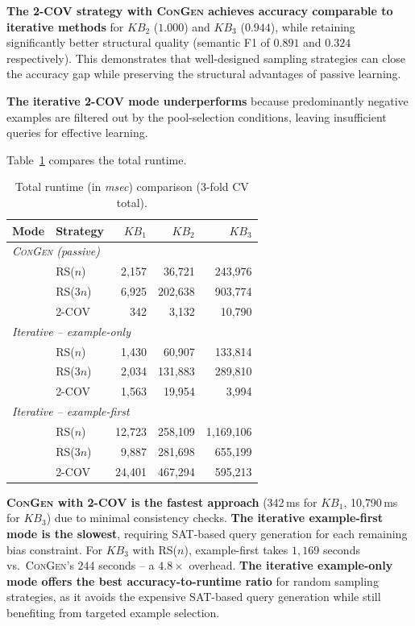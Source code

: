 \textbf{The 2-COV strategy with \textsc{ConGen} achieves accuracy comparable to iterative methods} for $KB_2$ ($1.000$) and $KB_3$ ($0.944$), while retaining significantly better structural quality (semantic F1 of $0.891$ and $0.324$ respectively). This demonstrates that well-designed sampling strategies can close the accuracy gap while preserving the structural advantages of passive learning.

\textbf{The iterative 2-COV mode underperforms} because predominantly negative examples are filtered out by the pool-selection conditions, leaving insufficient queries for effective learning.


Table~\ref{tab:runtime_comparison} compares the total runtime.

\begin{table}[htbp]
\centering
\caption{Total runtime (in \textit{msec}) comparison (3-fold CV total).}
\label{tab:runtime_comparison}
\begin{tabular}{llrrr}
\toprule
Mode & Strategy & $KB_1$ & $KB_2$ & $KB_3$ \\
\midrule
\multicolumn{5}{l}{\textit{\textsc{ConGen} (passive)}} \\
 & RS($n$)  & 2{,}157 & 36{,}721 & 243{,}976 \\
 & RS($3n$) & 6{,}925 & 202{,}638 & 903{,}774 \\
 & 2-COV    & 342 & 3{,}132 & 10{,}790 \\
\midrule
\multicolumn{5}{l}{\textit{Iterative -- example-only}} \\
 & RS($n$)  & 1{,}430 & 60{,}907 & 133{,}814 \\
 & RS($3n$) & 2{,}034 & 131{,}883 & 289{,}810 \\
 & 2-COV    & 1{,}563 & 19{,}954 & 3{,}994 \\
\midrule
\multicolumn{5}{l}{\textit{Iterative -- example-first}} \\
 & RS($n$)  & 12{,}723 & 258{,}109 & 1{,}169{,}106 \\
 & RS($3n$) & 9{,}887 & 281{,}698 & 655{,}199 \\
 & 2-COV    & 24{,}401 & 467{,}294 & 595{,}213 \\
\bottomrule
\end{tabular}
\end{table}

\textbf{\textsc{ConGen} with 2-COV is the fastest approach} (342\,ms for $KB_1$, 10{,}790\,ms for $KB_3$) due to minimal consistency checks.
\textbf{The iterative example-first mode is the slowest}, requiring SAT-based query generation for each remaining bias constraint. For $KB_3$ with RS($n$), example-first takes $1{,}169$ seconds vs.\ \textsc{ConGen}'s $244$ seconds -- a $4.8{\times}$ overhead.
\textbf{The iterative example-only mode offers the best accuracy-to-runtime ratio} for random sampling strategies, as it avoids the expensive SAT-based query generation while still benefiting from targeted example selection.

